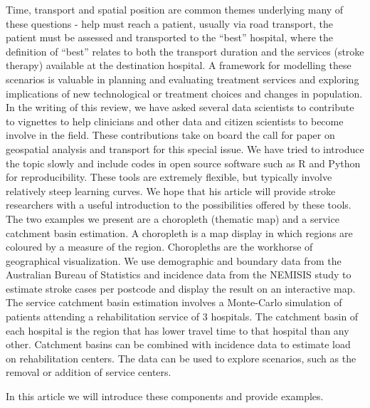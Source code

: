 \documentclass[utf8]{frontiersHLTH}
\begin{document}
Time, transport and spatial position are common themes underlying many
of these questions - help must reach a patient, usually via road
transport, the patient must be assessed and transported to the
``best'' hospital, where the definition of ``best'' relates to both
the transport duration and the services (stroke therapy) available at
the destination hospital. A framework for modelling these scenarios is
valuable in planning and evaluating treatment services and exploring
implications of new technological or treatment choices and changes in
population. In the writing of this review, we have asked several data
scientists to contribute to vignettes to help clinicians and other
data and citizen scientists to become involve in the field. These
contributions take on board the call for paper on geospatial analysis
and transport for this special issue. We have tried to introduce the
topic slowly and include codes in open source software such as R and
Python for reproducibility. These tools are extremely flexible, but
typically involve relatively steep learning curves. We hope that his
article will provide stroke researchers with a useful introduction to
the possibilities offered by these tools. The two examples we present
are a choropleth (thematic map) and a service catchment
basin estimation. A choropleth is a map display in which regions are
coloured by a measure of the region. Choropleths are the workhorse of
geographical visualization. We use demographic and boundary data from
the Australian Bureau of Statistics and incidence data from the
NEMISIS \cite{thrift_stroke_2000,azarpazhooh2008patterns} study to
estimate stroke cases per postcode and display the result on an
interactive map. The service catchment basin estimation involves a
Monte-Carlo simulation of patients attending a rehabilitation service
of 3 hospitals. The catchment basin of each hospital is the region
that has lower travel time to that hospital than any other.  Catchment
basins can be combined with incidence data to estimate load on
rehabilitation centers. The data can be used to explore scenarios,
such as the removal or addition of service centers.

In this article we will introduce these components and provide
examples.
\end{document}
